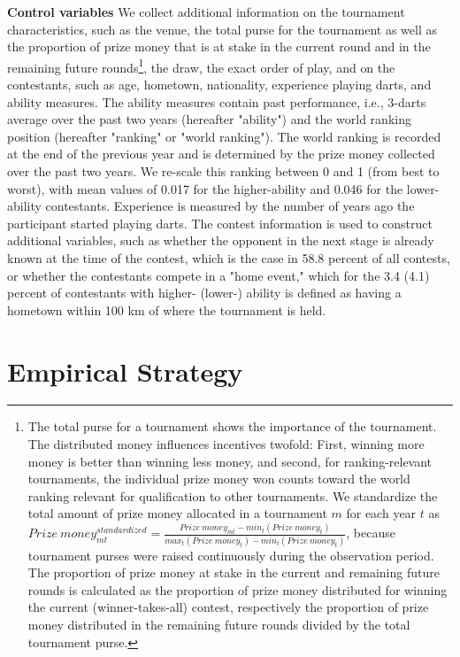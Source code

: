 \documentclass[11pt,a4paper]{article}
\let\Oldsection\section
\renewcommand{\section}{\FloatBarrier\Oldsection}
\begin{document}
\textbf{Control variables} We collect additional information on the tournament characteristics, such as the venue, the total purse for the tournament as well as the proportion of prize money that is at stake in the current round and in the remaining future rounds\footnote{The total purse for a tournament shows the importance of the tournament. The distributed money influences incentives twofold: First, winning more money is better than winning less money, and second, for ranking-relevant tournaments, the individual prize money won counts toward the world ranking relevant for qualification to other tournaments. We standardize the total amount of prize money allocated in a tournament $m$ for each year $t$ as $ Prize~money^{standardized}_{mt} = \frac{Prize~money_{mt}-min_t(Prize~money_t)}{max_t(Prize~money_t) - min_t(Prize~money_t)}$, because tournament purses were raised continuously during the observation period. The proportion of prize money at stake in the current and remaining future rounds is calculated as the proportion of prize money distributed for winning the current (winner-takes-all) contest, respectively the proportion of prize money distributed in the remaining future rounds divided by the total tournament purse.}, the draw, the exact order of play, and on the contestants, such as age, hometown, nationality, experience playing darts, and ability measures. The ability measures contain past performance, i.e., 3-darts average over the past two years (hereafter "ability") and the world ranking position (hereafter "ranking" or "world ranking"). The world ranking is recorded at the end of the previous year and is determined by the prize money collected over the past two years. We re-scale this ranking between 0 and 1 (from best to worst), with mean values of 0.017 for the higher-ability and 0.046 for the lower-ability contestants. Experience is measured by the number of years ago the participant started playing darts. The contest information is used to construct additional variables, such as whether the opponent in the next stage is already known at the time of the contest, which is the case in 58.8 percent of all contests, or whether the contestants compete in a "home event," which for the 3.4 (4.1) percent of contestants with higher- (lower-) ability is defined as having a hometown within 100 km of where the tournament is held.\par 

\section{Empirical Strategy}\label{sec:emp_strat}
\end{document}
